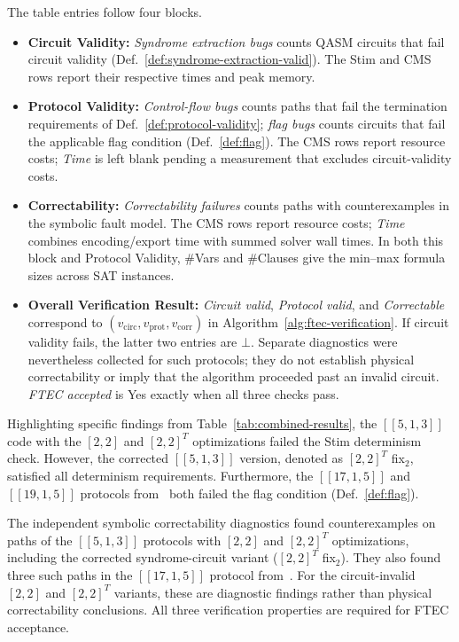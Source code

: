 \documentclass[acmsmall,screen,review,anonymous,nonacm]{acmart}
\begin{document}
The table entries follow four blocks.
\begin{itemize}
    \item \textbf{Circuit Validity:} \emph{Syndrome extraction bugs} counts QASM circuits that fail circuit validity (Def.~\ref{def:syndrome-extraction-valid}). The Stim and CMS rows report their respective times and peak memory.
    \item \textbf{Protocol Validity:} \emph{Control-flow bugs} counts paths that fail the termination requirements of Def.~\ref{def:protocol-validity}; \emph{flag bugs} counts circuits that fail the applicable flag condition (Def.~\ref{def:flag}). The CMS rows report resource costs; \emph{Time} is left blank pending a measurement that excludes circuit-validity costs.
    \item \textbf{Correctability:} \emph{Correctability failures} counts paths with counterexamples in the symbolic fault model. The CMS rows report resource costs; \emph{Time} combines encoding/export time with summed solver wall times. In both this block and Protocol Validity, \#Vars and \#Clauses give the min--max formula sizes across SAT instances.
    \item \textbf{Overall Verification Result:} \emph{Circuit valid}, \emph{Protocol valid}, and \emph{Correctable} correspond to $(v_{\mathrm{circ}},v_{\mathrm{prot}},v_{\mathrm{corr}})$ in Algorithm~\ref{alg:ftec-verification}. If circuit validity fails, the latter two entries are $\bot$. Separate diagnostics were nevertheless collected for such protocols; they do not establish physical correctability or imply that the algorithm proceeded past an invalid circuit. \emph{FTEC accepted} is Yes exactly when all three checks pass.
\end{itemize}







Highlighting specific findings from Table~\ref{tab:combined-results}, the $[[5,1,3]]$ code with the $[2,2]$ and $[2,2]^T$ optimizations failed the Stim determinism check. However, the corrected $[[5,1,3]]$ version, denoted as $[2,2]^T$ fix$_2$, satisfied all determinism requirements. Furthermore, the $[[17,1,5]]$ and $[[19,1,5]]$ protocols from~\cite{Du24} both failed the flag condition (Def.~\ref{def:flag}).

The independent symbolic correctability diagnostics found counterexamples
on paths of the $[[5,1,3]]$ protocols with $[2,2]$ and $[2,2]^T$
optimizations, including the corrected syndrome-circuit variant
($[2,2]^T$ fix$_2$). They also found three such paths in the
$[[17,1,5]]$ protocol from~\cite{Du24}. For the circuit-invalid
$[2,2]$ and $[2,2]^T$ variants, these are diagnostic findings rather
than physical correctability conclusions. All three verification
properties are required for FTEC acceptance.
 
\end{document}

